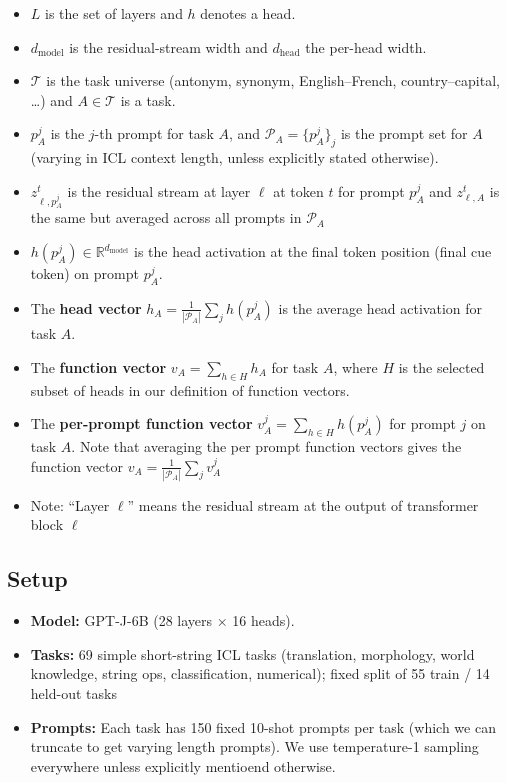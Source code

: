 \documentclass{article}
\renewcommand{\_}{\textunderscore\allowbreak}
\providecommand{\tightlist}{\setlength{\itemsep}{0pt}\setlength{\parskip}{0pt}}
\begin{document}
\begin{itemize}
\tightlist
\item
  \(L\) is the set of layers and \(h\) denotes a head.
\item
  \(d_{\mathrm{model}}\) is the residual-stream width and \(d_{\mathrm{head}}\) the per-head width.
\item
  \(\mathcal{T}\) is the task universe (antonym, synonym, English--French, country--capital, \ldots) and \(A \in \mathcal{T}\) is a task.
\item
  \(p_A^j\) is the \(j\)-th prompt for task \(A\), and \(\mathcal{P}_A = \{p_A^j\}_j\) is the prompt set for \(A\) (varying in ICL context length, unless explicitly stated otherwise).
\item
  \(z^t_{\ell, p_A^j}\) is the residual stream at layer \(\ell\) at token \(t\) for prompt \(p_A^j\) and \(z^t_{\ell, A}\) is the same but averaged across all prompts in \(\mathcal{P}_A\)
\item
  \(h(p_A^j) \in \mathbb{R}^{d_{\mathrm{model}}}\) is the head activation at the final token position (final cue token) on prompt \(p_A^j\).
\item
  The \textbf{head vector} \(h_A = \frac{1}{|\mathcal{P}_A|} \sum_j h(p_A^j)\) is the average head activation for task \(A\).
\item
  The \textbf{function vector} \(v_A = \sum_{h \in H} h_A\) for task \(A\), where \(H\) is the selected subset of heads in our definition of function vectors.
\item
  The \textbf{per-prompt function vector} \(v^j_A = \sum_{h \in H} h(p_A^j)\) for prompt \(j\) on task \(A\). Note that averaging the per prompt function vectors gives the function vector \(v_A = \frac{1}{|\mathcal{P}_A|} \sum_{j} v^j_A\)
\item
  Note: ``Layer \(\ell\)'' means the residual stream at the output of transformer block \(\ell\)
\end{itemize}

\subsection{Setup}\label{setup}

\begin{itemize}
\tightlist
\item
  \textbf{Model:} GPT-J-6B (28 layers × 16 heads).
\item
  \textbf{Tasks:} 69 simple short-string ICL tasks (translation, morphology, world knowledge, string ops, classification, numerical); fixed split of 55 train / 14 held-out tasks
\item
  \textbf{Prompts:} Each task has 150 fixed 10-shot prompts per task (which we can truncate to get varying length prompts). We use temperature-1 sampling everywhere unless explicitly mentioend otherwise.
\end{itemize}
\end{document}
